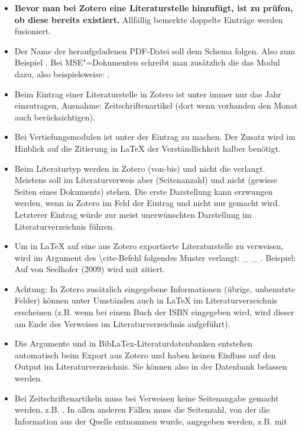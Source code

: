 \begin{itemize}%
\item \textbf{Bevor man bei Zotero eine Literaturstelle hinzufügt, ist zu prüfen, ob diese bereits existiert.} Allfällig bemerkte doppelte Einträge werden fusioniert.%
\item Der Name der heraufgeladenen PDF-Datei soll dem Schema  folgen. Also zum Beispiel . Bei MSE"=Dokumenten schreibt man zusätzlich die das Modul dazu, also beispielsweise: .%
\item Beim Eintrag einer Literaturstelle in Zotero ist unter  immer nur das Jahr einzutragen, Ausnahme: Zeitschriftenartikel (dort wenn vorhanden den Monat auch berücksichtigen).%
\item Bei Vertiefungsmodulen ist unter  der Eintrag  zu machen. Der Zusatz  wird im Hinblick auf die Zitierung in \LaTeX{} der Verständlichkeit halber benötigt.%
\item Beim Literaturtyp  werden in Zotero  (von-bis) und nicht die  verlangt. Meistens soll im Literaturverweis aber  (Seitenanzahl) und nicht  (gewisse Seiten eines Dokuments) stehen. Die erste Darstellung kann erzwungen werden, wenn in Zotero im Feld  der Eintrag  und nicht nur  gemacht wird. Letzterer Eintrag würde zur meist unerwünschten Darstellung   im Literaturverzeichnis führen.%
\item Um in \LaTeX{} auf eine aus Zotero exportierte Literaturstelle zu verweisen, wird im Argument des \textbackslash cite-Befehl folgendes Muster verlangt: \_  \_  . Beispiel: Auf  von Seelhofer (2009) wird mit  zitiert.%
\item Achtung: In Zotero zusätzlich eingegebene Informationen (übrige, unbenutzte Felder) können unter Umständen auch in \LaTeX{} im Literaturverzeichnis erscheinen (z.B. wenn bei einem Buch der ISBN eingegeben wird, wird dieser am Ende des Verweises im Literaturverzeichnis aufgeführt).%
\item Die Argumente  und  in BibLaTex-Literaturdatenbanken entstehen automatisch beim Export aus Zotero und haben keinen Einfluss auf den Output im Literaturverzeichnis. Sie können also in der Datenbank belassen werden.%
\item Bei Zeitschriftenartikeln muss bei Verweisen keine Seitenangabe gemacht werden, z.B. \cite{rusch_researches_1960}. In allen anderen Fällen muss die Seitenzahl, von der die Information aus der Quelle entnommen wurde, angegeben werden, z.B. \cite[S. 34]{seelhofer_ebener_2009} mit %
\end{itemize}%
